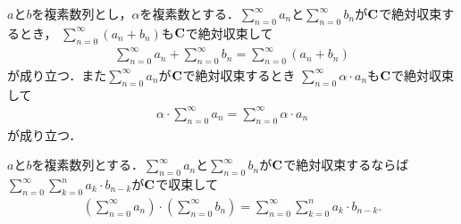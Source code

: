 	\begin{sketch}
		
	\end{sketch}
	
	\begin{screen}
		\begin{thm}[絶対収束する級数の線型性]
		\label{thm:linearity_of_absolutely_convergent_series}
			$a$と$b$を複素数列とし，$\alpha$を複素数とする．$\sum_{n=0}^\infty a_n$と$\sum_{n=0}^\infty b_n$が$\mathbf{C}$で絶対収束するとき，
			$\sum_{n=0}^\infty (a_n + b_n)$も$\mathbf{C}$で絶対収束して
			\begin{align}
				\sum_{n=0}^\infty a_n + \sum_{n=0}^\infty b_n = \sum_{n=0}^\infty (a_n + b_n)
			\end{align}
			が成り立つ．また$\sum_{n=0}^\infty a_n$が$\mathbf{C}$で絶対収束するとき
			$\sum_{n=0}^\infty \alpha \cdot a_n$も$\mathbf{C}$で絶対収束して
			\begin{align}
				\alpha \cdot \sum_{n=0}^\infty a_n = \sum_{n=0}^\infty \alpha \cdot a_n
			\end{align}
			が成り立つ．
		\end{thm}
	\end{screen}
	
	\begin{sketch}
	\end{sketch}
	
	\begin{screen}
		\begin{thm}[絶対収束級数の畳み込み]\label{thm:convolution_of_absolutely_convergent_series}
			$a$と$b$を複素数列とする．$\sum_{n=0}^\infty a_n$と$\sum_{n=0}^\infty b_n$が$\mathbf{C}$で絶対収束するならば
			$\sum_{n=0}^\infty \sum_{k=0}^n a_k \cdot b_{n-k}$が$\mathbf{C}$で収束して
			\begin{align}
				\left(\sum_{n=0}^\infty a_n\right) \cdot \left(\sum_{n=0}^\infty b_n\right)
				= \sum_{n=0}^\infty \sum_{k=0}^n a_k \cdot b_{n-k}.
			\end{align}
		\end{thm}
	\end{screen}
	
	\begin{sketch}
	\end{sketch}
	